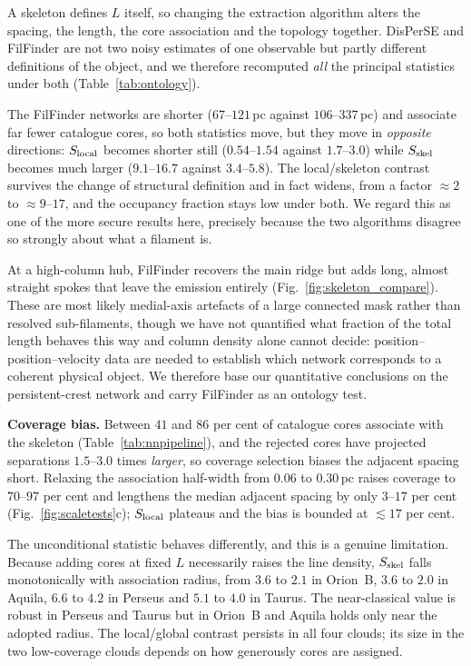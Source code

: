 \documentclass[usenatbib,twoside,twocolumn]{mnras}
\begin{document}
A skeleton defines $L$ itself, so changing the extraction algorithm alters the spacing, the length, the core association and the topology together. DisPerSE \citep{Sousbie2011} and FilFinder \citep{Koch2015} are not two noisy estimates of one observable but partly different definitions of the object, and we therefore recomputed \emph{all} the principal statistics under both (Table~\ref{tab:ontology}).

The FilFinder networks are shorter ($67$--$121$\,pc against $106$--$337$\,pc) and associate far fewer catalogue cores, so both statistics move, but they move in \emph{opposite} directions: $S_{\rm local}$ becomes shorter still ($0.54$--$1.54$ against $1.7$--$3.0$) while $S_{\rm skel}$ becomes much larger ($9.1$--$16.7$ against $3.4$--$5.8$). The local/skeleton contrast survives the change of structural definition and in fact widens, from a factor $\approx2$ to $\approx9$--$17$, and the occupancy fraction stays low under both. We regard this as one of the more secure results here, precisely because the two algorithms disagree so strongly about what a filament is.

At a high-column hub, FilFinder recovers the main ridge but adds long, almost straight spokes that leave the emission entirely (Fig.~\ref{fig:skeleton_compare}). These are most likely medial-axis artefacts of a large connected mask rather than resolved sub-filaments, though we have not quantified what fraction of the total length behaves this way and column density alone cannot decide: position--position--velocity data are needed to establish which network corresponds to a coherent physical object. We therefore base our quantitative conclusions on the persistent-crest network and carry FilFinder as an ontology test.

\smallskip\noindent\textbf{Coverage bias.} Between $41$ and $86$ per cent of catalogue cores associate with the skeleton (Table~\ref{tab:nnpipeline}), and the rejected cores have projected separations $1.5$--$3.0$ times \emph{larger}, so coverage selection biases the adjacent spacing short. Relaxing the association half-width from $0.06$ to $0.30$\,pc raises coverage to $70$--$97$ per cent and lengthens the median adjacent spacing by only $3$--$17$ per cent (Fig.~\ref{fig:scaletests}c); $S_{\rm local}$ plateaus and the bias is bounded at $\lesssim17$ per cent.

The unconditional statistic behaves differently, and this is a genuine limitation. Because adding cores at fixed $L$ necessarily raises the line density, $S_{\rm skel}$ falls monotonically with association radius, from $3.6$ to $2.1$ in Orion~B, $3.6$ to $2.0$ in Aquila, $6.6$ to $4.2$ in Perseus and $5.1$ to $4.0$ in Taurus. The near-classical value is robust in Perseus and Taurus but in Orion~B and Aquila holds only near the adopted radius. The local/global contrast persists in all four clouds; its size in the two low-coverage clouds depends on how generously cores are assigned.
\end{document}
